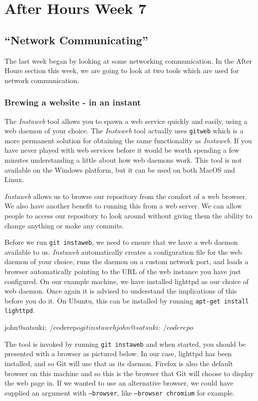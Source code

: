 \chapter{After Hours Week 7}
\section{``Network Communicating''}
The last week began by looking at some networking communication.
In the After Hours section this week, we are going to look at two tools which are used for network communication.

\subsection{Brewing a website - in an instant}
The \emph{Instaweb} tool allows you to spawn a web service quickly and easily, using a web daemon of your choice.
The \emph{Instaweb} tool actually uses \texttt{gitweb} which is a more permanent solution for obtaining the same functionality as \emph{Instaweb}.
If you have never played with web services before it would be worth spending a few minutes understanding a little about how web daemons work.
This tool is not available on the Windows platform, but it can be used on both MacOS and Linux.

\emph{Instaweb} allows us to browse our repository from the comfort of a web browser.
We also have another benefit to running this from a web server.
We can allow people to access our repository to look around without giving them the ability to change anything or make any commits.

Before we run \texttt{git instaweb}, we need to ensure that we have a web daemon available to us.
\emph{Instaweb} automatically creates a configuration file for the web daemon of your choice, runs the daemon on a custom network port,
and loads a browser automatically pointing to the URL of the web instance you have just configured.
On our example machine, we have installed lighttpd as our choice of web daemon.
Once again it is advised to understand the implications of this before you do it.
On Ubuntu, this can be installed by running \texttt{apt-get install lighttpd}.

\begin{code}
john@satsuki:~/coderepo$ git instaweb
john@satsuki:~/coderepo$ 
\end{code}

The tool is invoked by running \texttt{git instaweb} and when started, you should be presented with a browser as pictured below.
In our case, lighttpd has been installed, and so Git will use that as its daemon.
Firefox is also the default browser on this machine and so this is the browser that Git will choose to display the web page in.
If we wanted to use an alternative browser, we could have supplied an argument with \texttt{--browser}, like \texttt{--browser chromium} for example.


